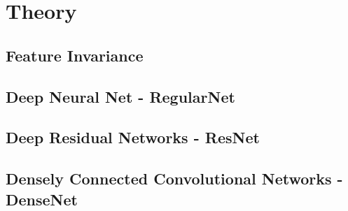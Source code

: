 \chapter{Theory}
\label{chp:theory}

\section{Feature Invariance}
\section{Deep Neural Net - RegularNet}

\section{Deep Residual Networks - ResNet}
\section{Densely Connected Convolutional Networks - DenseNet}
